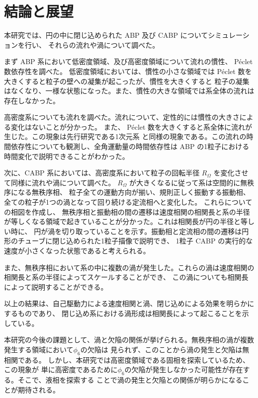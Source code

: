 \documentclass[/Users/ikedahajime/GitHub/reserch/master_report/thesis]{subfiles}
\begin{document}
\chapter{結論と展望}
本研究では、円の中に閉じ込められた ABP 及び CABP についてシミュレーションを行い、
それらの流れや渦について調べた。

まず ABP 系において低密度領域、及び高密度領域について流れの慣性、 Péclet 数依存性を調べた。
低密度領域においては、慣性の小さな領域では Péclet 数を大きくすると粒子の壁への凝集が起こったが、慣性を大きくすると
粒子の凝集はなくなり、一様な状態になった。また、慣性の大きな領域では系全体の流れは存在しなかった。

高密度系についても流れを調べた。流れについて、定性的には慣性の大きさによる変化はないことが分かった。
また、 Péclet 数を大きくすると系全体に流れが生じた。この現象は先行研究である1次元系\cite{capriniCollectiveEffectsConfined2021}
と同様の現象である。この流れの時間依存性についても観測し、全角運動量の時間依存性は ABP の1粒子における
時間変化で説明できることがわかった。


次に、CABP 系においては、高密度系において粒子の回転半径 $R_\Omega$ を変化させて同様に流れや渦について調べた。
$R_\Omega$ が大きくなるに従って系は空間的に無秩序になる無秩序相、
粒子全ての運動方向が揃い、規則正しく振動する振動相、全ての粒子が1つの渦となって回り続ける定流相へと変化した。
これらについての相図を作成し、
無秩序相と振動相の間の遷移は速度相関の相関長と系の半径が等しくなる領域で起きていることが分かった。これは相関長が円の半径と等しい時に、
円が渦を切り取っていることを示す。振動相と定流相の間の遷移は円形のチューブに閉じ込められた1粒子描像で説明でき、
1粒子 CABP の実行的な速度が小さくなった状態であると考えられる。

また、無秩序相において系の中に複数の渦が発生した。これらの渦は速度相関の相関長と系の半径によってスケールすることができ、
この渦についても相関長によって説明することができる。

以上の結果は、自己駆動力による速度相関と渦、閉じ込めによる効果を明らかにするものであり、
閉じ込め系における渦形成は相関長によって起こることを示している。

本研究の今後の課題として、渦と欠陥の関係が挙げられる。無秩序相の渦が複数発生する領域において$\phi_6$の欠陥は
見られず、このことから渦の発生と欠陥は無相関である。
しかし、本研究では高密度領域である固相\cite{kurodaLongrangeTranslationalOrder2024}を探索しているため、この現象が
単に高密度であるために$\phi_6$の欠陥が発生しなかった可能性が存在する。そこで、液相を探索する
ことで渦の発生と欠陥との関係が明らかになることが期待される。
\end{document}
